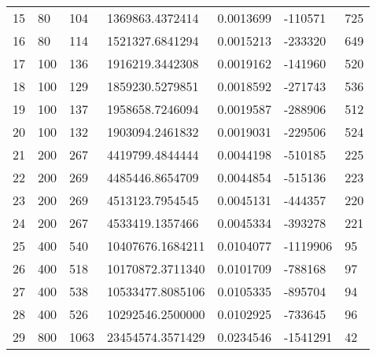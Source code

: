 \begin{longtable}{lllllll}
    15               & 80             & 104            & 1369863.4372414    & 0.0013699        & -110571         & 725                  \\
    16               & 80             & 114            & 1521327.6841294    & 0.0015213        & -233320         & 649                  \\
    17               & 100            & 136            & 1916219.3442308    & 0.0019162        & -141960         & 520                  \\
    18               & 100            & 129            & 1859230.5279851    & 0.0018592        & -271743         & 536                  \\
    19               & 100            & 137            & 1958658.7246094    & 0.0019587        & -288906         & 512                  \\
    20               & 100            & 132            & 1903094.2461832    & 0.0019031        & -229506         & 524                  \\
    21               & 200            & 267            & 4419799.4844444    & 0.0044198        & -510185         & 225                  \\
    22               & 200            & 269            & 4485446.8654709    & 0.0044854        & -515136         & 223                  \\
    23               & 200            & 269            & 4513123.7954545    & 0.0045131        & -444357         & 220                  \\
    24               & 200            & 267            & 4533419.1357466    & 0.0045334        & -393278         & 221                  \\
    25               & 400            & 540            & 10407676.1684211   & 0.0104077        & -1119906        & 95                   \\
    26               & 400            & 518            & 10170872.3711340   & 0.0101709        & -788168         & 97                   \\
    27               & 400            & 538            & 10533477.8085106   & 0.0105335        & -895704         & 94                   \\
    28               & 400            & 526            & 10292546.2500000   & 0.0102925        & -733645         & 96                   \\
    29               & 800            & 1063           & 23454574.3571429   & 0.0234546        & -1541291        & 42                   \\

\end{longtable}
